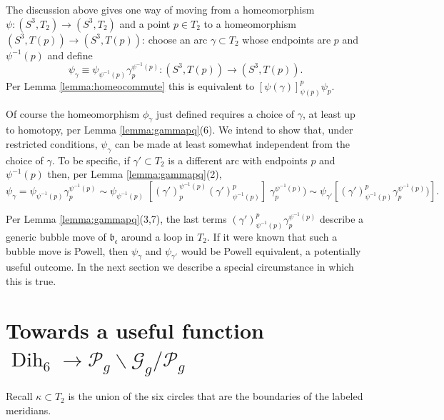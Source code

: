 \documentclass[12pt]{amsart}
\newcommand{\calG}{\mathcal G}
\newcommand{\calP}{\mathcal P}
\newcommand{\bs}{\backslash}
\newcommand{\Dih}{\operatorname{Dih}}
\newcommand{\frb}{\mathfrak{b}}
\newcommand{\frc}{\mbox{$\mathfrak{c}$}}
\begin{document}
 The discussion above gives one way of moving from a homeomorphism $\psi: (S^3, T_2) \to (S^3, T_2)$ and a point $p \in T_2$ to a homeomorphism $(S^3, T(p)) \to (S^3, T(p))$:  choose an arc $\gamma \subset T_2$ whose endpoints are $p$ and $\psi^{-1}(p)$ and define
 \[ \psi_{\gamma} \equiv \psi_{\psi^{-1}(p)} \gamma_p^{\psi^{-1}(p)}:(S^3, T(p)) \to (S^3, T(p)).\] 
 Per Lemma \ref{lemma:homeocommute} this is equivalent to $[\psi(\gamma)]^p_{\psi(p)} \psi_p$.  
 
 Of course the homeomorphism $\phi_{\gamma}$ just defined requires a choice of $\gamma$, at least up to homotopy, per Lemma \ref{lemma:gammapq}(6).  We intend to show that, under restricted conditions, $\psi_{\gamma}$ can be made at least somewhat independent from the choice of $\gamma$.  To be specific, if $\gamma' \subset T_2$ is a different arc with endpoints $p$ and $\psi^{-1}(p)$ then, per  Lemma \ref{lemma:gammapq}(2),
 \[\psi_{\gamma} = \psi_{\psi^{-1}(p)} \gamma_p^{\psi^{-1}(p)} \sim\psi_{\psi^{-1}(p)} \;[(\gamma')_p^{\psi^{-1}(p)}(\gamma')^p_{\psi^{-1}(p)}]\;\gamma_p^{\psi^{-1}(p)}) \sim \psi _{\gamma'}[(\gamma')^p_{\psi^{-1}(p)}\gamma_p^{\psi^{-1}(p)})].\]

Per Lemma \ref{lemma:gammapq}(3,7), the last terms $(\gamma')^p_{\psi^{-1}(p)}\gamma_p^{\psi^{-1}(p)}$ describe a generic bubble move of $\frb_{\frc}$ around a loop in $T_2$.  If it were known that such a bubble move is Powell, then $\psi_{\gamma}$ and $\psi_{\gamma'}$ would be Powell equivalent, a potentially useful outcome.   In the next section we describe a special circumstance in which this is true.

\section{Towards a useful function $\Dih_6 \to \calP_{g}\bs\calG_g/\calP_g$}

Recall $\kappa \subset T_2$ is the union of the six circles that are the boundaries of the labeled meridians.  
\end{document}
